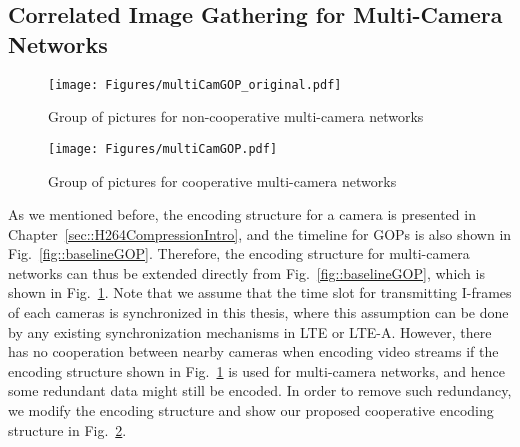 {%
%
\subsection{Correlated Image Gathering for Multi-Camera Networks}
%
\begin{figure}
\begin{center}
\texttt{[image: Figures/multiCamGOP\_original.pdf]}
\caption{\label{fig::multiCamGOP_original}Group of pictures for non-cooperative multi-camera networks}
\end{center}
\end{figure}
%
\begin{figure}
\begin{center}
\texttt{[image: Figures/multiCamGOP.pdf]}
\caption{\label{fig::multiCamGOP}Group of pictures for cooperative multi-camera networks}
\end{center}
\end{figure}
%
As we mentioned before, the encoding structure for a camera is presented in Chapter~\ref{sec::H264CompressionIntro}, and the timeline for GOPs is also shown in Fig.~\ref{fig::baselineGOP}.
Therefore, the encoding structure for multi-camera networks can thus be extended directly from Fig.~\ref{fig::baselineGOP}, which is shown in Fig.~\ref{fig::multiCamGOP_original}.
Note that we assume that the time slot for transmitting I-frames of each cameras is synchronized in this thesis, where this assumption can be done by any existing synchronization mechanisms in LTE or LTE-A.
However, there has no cooperation between nearby cameras when encoding video streams if the encoding structure shown in Fig.~\ref{fig::multiCamGOP_original} is used for multi-camera networks, and hence some redundant data might still be encoded.
In order to remove such redundancy, we modify the encoding structure and show our proposed cooperative encoding structure in Fig.~\ref{fig::multiCamGOP}.

}
